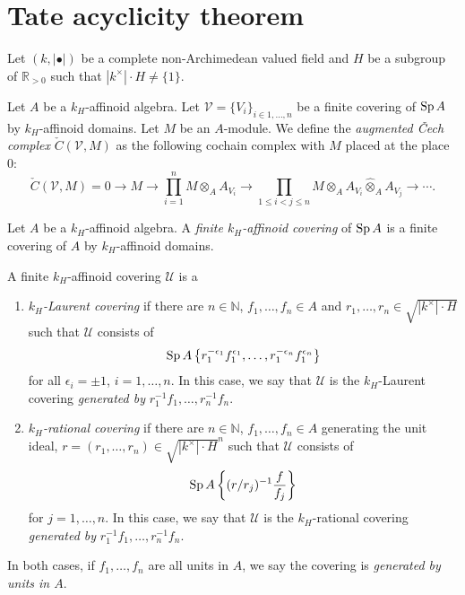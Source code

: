 \section{Tate acyclicity theorem}
Let $(k,|\bullet|)$ be a complete non-Archimedean valued field and $H$ be a subgroup of $\mathbb{R}_{>0}$ such that $|k^{\times}|\cdot H\neq \{1\}$.


\begin{definition}
    Let $A$ be a $k_H$-affinoid algebra. Let $\mathcal{V}=\{V_i\}_{i\in 1,\ldots,n}$ be a finite covering of $\operatorname{Sp} A$ by $k_H$-affinoid domains. Let $M$ be an $A$-module. We define the \emph{augmented \v{C}ech complex} $\check{C}(\mathcal{V},M)$ as the following cochain complex with $M$ placed at the place $0$:
    \[
        \check{C}(\mathcal{V},M)=0\rightarrow M\rightarrow  \prod_{i=1}^n M\otimes_{A} A_{V_i}\rightarrow \prod_{1\leq i<j\leq n} M\otimes_{A} A_{V_i}\hat{\otimes}_A A_{V_j}\rightarrow \cdots.
    \]
\end{definition}

\begin{definition}
    Let $A$ be a $k_H$-affinoid algebra. A \emph{finite $k_H$-affinoid covering} of $\operatorname{Sp} A$ is a finite covering of $A$ by $k_H$-affinoid domains.

    A finite $k_H$-affinoid covering $\mathcal{U}$ is a 
    \begin{enumerate}
        \item \emph{$k_H$-Laurent covering} if there are $n\in \mathbb{N}$, $f_1,\ldots,f_n\in A$ and $r_1,\ldots,r_n\in \sqrt{|k^{\times}|\cdot H}$ such that $\mathcal{U}$ consists of 
        \[  
            \operatorname{Sp} A\left\{ r_1^{-\epsilon_1}f_1^{\epsilon_1},\ldots,r_1^{-\epsilon_n}f_1^{\epsilon_n}\right\}
        \]
        for all $\epsilon_i=\pm 1$, $i=1,\ldots,n$. In this case, we say that $\mathcal{U}$ is the $k_H$-Laurent covering \emph{generated by} $r_1^{-1}f_1,\ldots,r_{n}^{-1}f_n$. 
        \item \emph{$k_H$-rational covering} if there are $n\in \mathbb{N}$, $f_1,\ldots,f_n\in A$ generating the unit ideal, $r=(r_1,\ldots,r_n)\in \sqrt{|k^{\times}|\cdot H}^n$ such that $\mathcal{U}$ consists of
        \[
            \operatorname{Sp} A\left\{ (r/r_j)^{-1} \frac{f}{f_j} \right\}    
        \]
        for $j=1,\ldots,n$. In this case, we say that $\mathcal{U}$ is the $k_H$-rational covering \emph{generated by} $r_1^{-1}f_1,\ldots,r_{n}^{-1}f_n$. 
    \end{enumerate}
    In both cases, if $f_1,\ldots,f_n$ are all units in $A$, we say the covering is \emph{generated by units in $A$}. 
\end{definition}

